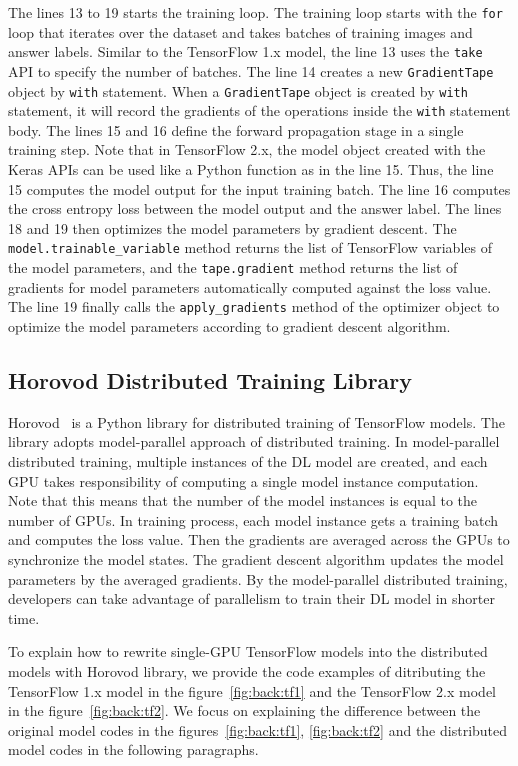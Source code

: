 The lines 13 to 19 starts the training loop.
The training loop starts with the {\tt for} loop that iterates over the dataset
and takes batches of training images and answer labels.
Similar to the TensorFlow 1.x model,
the line 13 uses the {\tt take} API to specify the number of batches.
The line 14 creates a new {\tt GradientTape} object by {\tt with} statement.
When a {\tt GradientTape} object is created by {\tt with} statement,
it will record the gradients of the operations inside the {\tt with}
statement body.
The lines 15 and 16 define the forward propagation stage in a single
training step.
Note that in TensorFlow 2.x, the model object created with the Keras APIs can be
used like a Python function as in the line 15.
Thus, the line 15 computes the model output for the input training batch. 
The line 16 computes the cross entropy loss between the model output and
the answer label.
The lines 18 and 19 then optimizes the model parameters by gradient descent. 
The {\tt model.trainable\_variable} method returns the list of 
TensorFlow variables of the model parameters,
and the {\tt tape.gradient} method returns the list of
gradients for model parameters automatically computed against the
loss value.
The line 19 finally calls the {\tt apply\_gradients} method of the optimizer
object to optimize the model parameters according to gradient descent algorithm.


\subsection{Horovod Distributed Training Library}

Horovod~\cite{sergeev2018horovod} is a Python library for distributed training 
of TensorFlow models. The library adopts model-parallel approach of distributed 
training. 
In model-parallel distributed training, multiple instances of the DL model
are created, and each GPU takes responsibility of computing a single model
instance computation. %
Note that this means that the number of the model instances 
is equal to the number of GPUs.
In training process, each model instance gets a training batch and computes the
loss value. Then the gradients are averaged across the GPUs to synchronize the
model states. The gradient descent algorithm updates the model parameters by
the averaged gradients.
By the model-parallel distributed training, developers can take advantage of
parallelism to train their DL model in shorter time.

To explain how to rewrite single-GPU TensorFlow models into the distributed 
models with Horovod library, we provide the code examples of ditributing 
the TensorFlow 1.x model in the figure~\ref{fig:back:tf1} and the TensorFlow
2.x model in the figure~\ref{fig:back:tf2}.
We focus on explaining the difference between the original model codes in
the figures~\ref{fig:back:tf1}, \ref{fig:back:tf2} and the distributed 
model codes in the following paragraphs.

